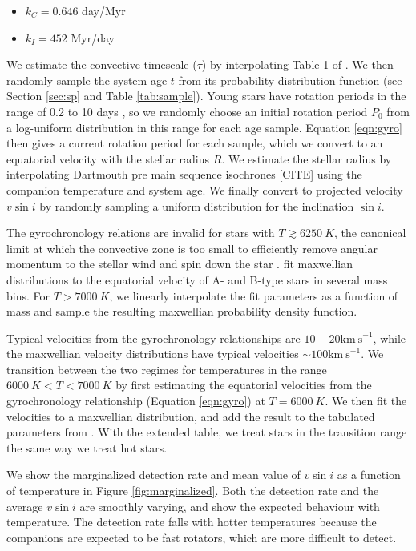 \documentclass{emulateapj}
\begin{document}
\begin{itemize}
\item $k_C = 0.646$ day/Myr
\item $k_I = 452$ Myr/day
\end{itemize}
We estimate the convective timescale ($\tau$) by interpolating Table 1 of \citet{Barnes2010a}. We then randomly sample the system age $t$ from its probability distribution function (see Section \ref{sec:sp} and Table \ref{tab:sample}). Young stars have rotation periods in the range of 0.2 to 10 days \citep{Bouvier2014}, so we randomly choose an initial rotation period $P_0$ from a log-uniform distribution in this range for each age sample. Equation \ref{eqn:gyro} then gives a current rotation period for each sample, which we convert to an equatorial velocity with the stellar radius $R$. We estimate the stellar radius by interpolating Dartmouth pre main sequence isochrones [CITE] using the companion temperature and system age. We finally convert to projected velocity $v\sin{i}$ by randomly sampling a uniform distribution for the inclination $\sin{i}$.

The gyrochronology relations are invalid for stars with $T \gtrsim 6250\ K$, the canonical limit at which the convective zone is too small to efficiently remove angular momentum to the stellar wind and spin down the star \citep{Pinsonneault2001}. \citet{Zorec2012} fit maxwellian distributions to the equatorial velocity of A- and B-type stars in several mass bins. For $T > 7000\ K$, we linearly interpolate the fit parameters as a function of mass and sample the resulting maxwellian probability density function. 

Typical velocities from the gyrochronology relationships are $10-20 \mathrm{km\ s}^{-1}$, while the maxwellian velocity distributions have typical velocities $\sim 100 \mathrm{km\ s}^{-1}$. We transition between the two regimes for temperatures in the range $6000\ K < T < 7000\ K$ by first estimating the equatorial velocities from the gyrochronology relationship (Equation \ref{eqn:gyro}) at $T=6000\ K$. We then fit the velocities to a maxwellian distribution, and add the result to the tabulated parameters from \citep{Zorec2012}. With the extended table, we treat stars in the transition range the same way we treat hot stars.
 
We show the marginalized detection rate and mean value of $v\sin{i}$ as a function of temperature in Figure \ref{fig:marginalized}. Both the detection rate and the average $v\sin{i}$ are smoothly varying, and show the expected behaviour with temperature. The detection rate falls with hotter temperatures because the companions are expected to be fast rotators, which are more difficult to detect. 
\end{document}
